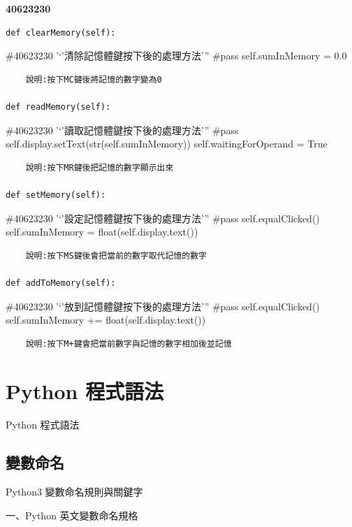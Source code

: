 \documentclass[12pt,,]{report}
\begin{document}
\textbf{40623230}

\begin{verbatim}
def clearMemory(self):
\end{verbatim}

\#40623230 '`'清除記憶體鍵按下後的處理方法''' \#pass self.sumInMemory =
0.0

\begin{verbatim}
    說明:按下MC鍵後將記憶的數字變為0
    
def readMemory(self):
\end{verbatim}

\#40623230 '`'讀取記憶體鍵按下後的處理方法''' \#pass
self.display.setText(str(self.sumInMemory)) self.waitingForOperand =
True

\begin{verbatim}
    說明:按下MR鍵後把記憶的數字顯示出來
    
def setMemory(self):
\end{verbatim}

\#40623230 '`'設定記憶體鍵按下後的處理方法''' \#pass self.equalClicked()
self.sumInMemory = float(self.display.text())

\begin{verbatim}
    說明:按下MS鍵後會把當前的數字取代記憶的數字
    
def addToMemory(self):
\end{verbatim}

\#40623230 '`'放到記憶體鍵按下後的處理方法''' \#pass self.equalClicked()
self.sumInMemory += float(self.display.text())

\begin{verbatim}
    說明:按下M+鍵會把當前數字與記憶的數字相加後並記憶
\end{verbatim}

\hypertarget{python-ux7a0bux5f0fux8a9eux6cd5}{%
\chapter{Python 程式語法}\label{python-ux7a0bux5f0fux8a9eux6cd5}}

Python 程式語法

\hypertarget{ux8b8aux6578ux547dux540d}{%
\section{變數命名}\label{ux8b8aux6578ux547dux540d}}

Python3 變數命名規則與關鍵字

一、Python 英文變數命名規格
\end{document}
